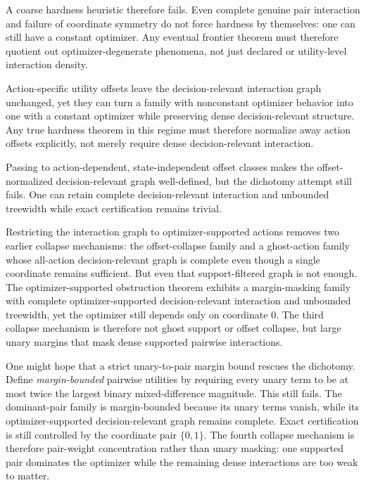 A coarse hardness heuristic therefore fails. Even complete genuine pair interaction and failure of coordinate symmetry do not force hardness by themselves: one can still have a constant optimizer. Any eventual frontier theorem must therefore quotient out optimizer-degenerate phenomena, not just declared or utility-level interaction density.

Action-specific utility offsets leave the decision-relevant interaction graph unchanged, yet they can turn a family with nonconstant optimizer behavior into one with a constant optimizer while preserving dense decision-relevant structure. Any true hardness theorem in this regime must therefore normalize away action offsets explicitly, not merely require dense decision-relevant interaction.

Passing to action-dependent, state-independent offset classes makes the offset-normalized decision-relevant graph well-defined, but the dichotomy attempt still fails. One can retain complete decision-relevant interaction and unbounded treewidth while exact certification remains trivial.

Restricting the interaction graph to optimizer-supported actions removes two earlier collapse mechanisms: the offset-collapse family and a ghost-action family whose all-action decision-relevant graph is complete even though a single coordinate remains sufficient. But even that support-filtered graph is not enough. The optimizer-supported obstruction theorem exhibits a margin-masking family with complete optimizer-supported decision-relevant interaction and unbounded treewidth, yet the optimizer still depends only on coordinate $0$. The third collapse mechanism is therefore not ghost support or offset collapse, but large unary margins that mask dense supported pairwise interactions.

One might hope that a strict unary-to-pair margin bound rescues the dichotomy. Define \emph{margin-bounded} pairwise utilities by requiring every unary term to be at most twice the largest binary mixed-difference magnitude. This still fails. The dominant-pair family is margin-bounded because its unary terms vanish, while its optimizer-supported decision-relevant graph remains complete. Exact certification is still controlled by the coordinate pair $\{0,1\}$. The fourth collapse mechanism is therefore pair-weight concentration rather than unary masking: one supported pair dominates the optimizer while the remaining dense interactions are too weak to matter.

